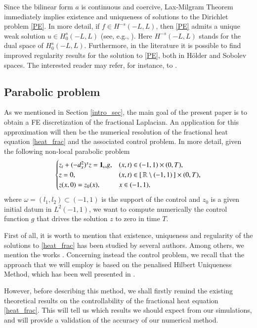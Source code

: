 Since the bilinear form $a$ is continuous and coercive, Lax-Milgram Theorem immediately implies existence and uniqueness of solutions to the Dirichlet problem \eqref{PE}. In more detail, if $f\in H^{-s}(-L,L)$, then \eqref{PE} admits a unique weak solution $u\in H_0^s(-L,L)$ (see, e.g., \cite[Proposition 2.1]{biccari2017local}). Here $H^{-s}(-L,L)$ stands for the dual space of $H^s_0(-L,L)$. Furthermore, in the literature it is possible to find improved regularity results for the solution to \eqref{PE}, both in H\"older and Sobolev spaces. The interested reader may refer, for instance, to \cite{acosta2017fractional,biccari2017local,leonori2015basic,ros2014dirichlet,ros2014extremal}.

\subsection{Parabolic problem}

As we mentioned in Section \ref{intro_sec}, the main goal of the present paper is to obtain a FE discretization of the fractional Laplacian. An application for this approximation will then be the numerical resolution of the fractional heat equation \ref{heat_frac} and the associated control problem. In more detail, given the following non-local parabolic problem 
\begin{align*}
	\begin{cases}
		z_t+(-d_x^2)^{s}z =\mathbf{1}_\omega g, & (x,t)\in (-1,1)\times (0,T), 
		\\
		z=0, & (x,t)\in [\,\mathbb{R} \setminus (-1,1)\,]\times (0,T), 
		\\
		z(x,0)=z_0(x), & x\in (-1,1),
	\end{cases}
\end{align*}
where $\omega=(l_1,l_2)\subset (-1,1)$ is the support of the control and $z_0$ is a given initial datum in $L^2(-1,1)$, we want to compute numerically the control function $g$ that drives the solution $z$ to zero in time $T$. 

First of all, it is worth to mention that existence, uniqueness and regularity of the solutions to \eqref{heat_frac} has been studied by several authors. Among others, we mention the works \cite{biccari2017local,fernandez2016boundary,leonori2015basic}. Concerning instead the control problem, we recall that the approach that we will employ is based on the penalised Hilbert Uniqueness Method, which has been well presented in \cite{boyer2013penalised}. 

However, before describing this method, we shall firstly remind the existing theoretical results on the controllability of the fractional heat equation \eqref{heat_frac}. This will tell us which results we should expect from our simulations, and will provide a validation of the accuracy of our numerical method.

